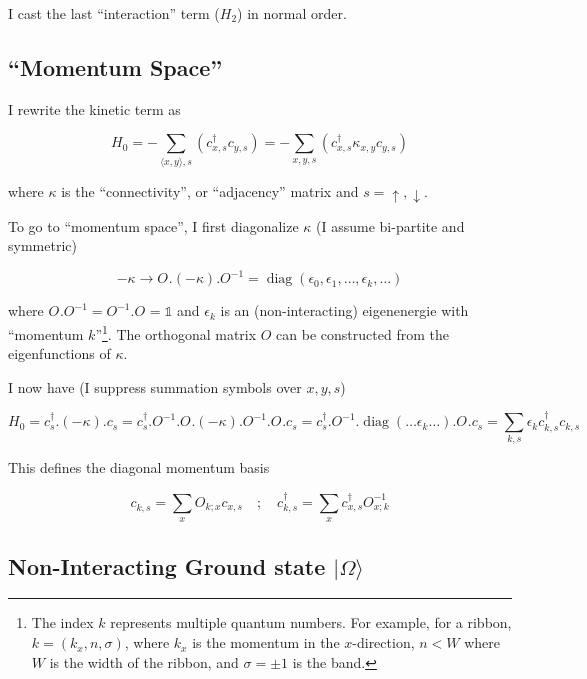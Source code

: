 \documentclass[
  letterpaper,
  DIV=11,
  numbers=noendperiod]{scrartcl}
\begin{document}
I cast the last ``interaction'' term (\(H_2\)) in normal order.

\subsection{``Momentum Space''}\label{momentum-space}

I rewrite the kinetic term as

\begin{equation}
H_0=-\sum_{\langle x,y\rangle,s}\left(c^\dagger_{x,s}c^{}_{y,s}\right)=-\sum_{x,y,s}\left(c^\dagger_{x,s}\kappa_{x,y}c^{}_{y,s}\right)
\end{equation}

where \(\kappa\) is the ``connectivity'', or ``adjacency'' matrix and
\(s=\uparrow,\downarrow\).

To go to ``momentum space'', I first diagonalize \(\kappa\) (I assume
bi-partite and symmetric)

\begin{equation}
-\kappa\to O^{}.(-\kappa).O^{-1}=\operatorname{diag}(\epsilon_{0},\epsilon_{1},\ldots, \epsilon_{k},\ldots )
\end{equation}

where \(O^{}.O^{-1}=O^{-1}.O^{}=\mathbb{1}\) and \(\epsilon_{k}\) is an
(non-interacting) eigenenergie with ``momentum \(k\)''\footnote{The
  index \(k\) represents multiple quantum numbers. For example, for a
  ribbon, \(k=(k_x,n,\sigma)\), where \(k_x\) is the momentum in the
  \(x\)-direction, \(n<W\) where \(W\) is the width of the ribbon, and
  \(\sigma=\pm 1\) is the band.}. The orthogonal matrix \(O\) can be
constructed from the eigenfunctions of \(\kappa\).

I now have (I suppress summation symbols over \(x,y,s\))

\begin{equation}
H_0=c^\dagger_{s}.(-\kappa).c^{}_{s}=c^\dagger_{s}.O^{-1}.O^{}.(-\kappa).O^{-1}.O^{}.c^{}_{s}=c^\dagger_{s}.O^{-1}.\operatorname{diag}(\ldots \epsilon_{k}\ldots).O^{}.c^{}_{s}
=\sum_{k,s}\epsilon_{k}c^{\dagger}_{k,s}c^{}_{k,s}
\end{equation}

This defines the diagonal momentum basis

\begin{equation}
c^{}_{k,s}=\sum_{x}O_{k;x}c^{}_{x,s}\quad;\quad c^{\dagger}_{k,s}=\sum_{x}c^{\dagger}_{x,s}O^{-1}_{x;k}
\end{equation}

\subsection{\texorpdfstring{Non-Interacting Ground state
\(|\Omega\rangle\)}{Non-Interacting Ground state \textbar\textbackslash Omega\textbackslash rangle}}\label{non-interacting-ground-state-omegarangle}
\end{document}
